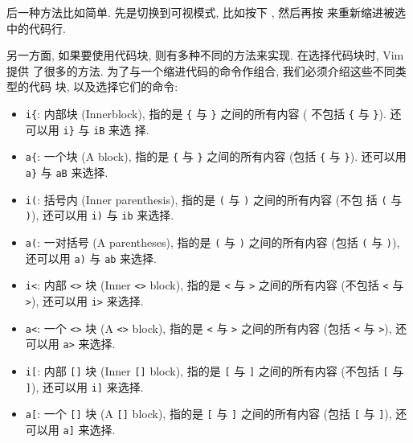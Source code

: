 后一种方法比如简单. 先是切换到可视模式, 比如按下 , 然后再按
\key{=} 来重新缩进被选中的代码行.

另一方面, 如果要使用代码块, 则有多种不同的方法来实现. 在选择代码块时, Vim 提供
了很多的方法. 为了与一个缩进代码的命令作组合, 我们必须介绍这些不同类型的代码
块, 以及选择它们的命令:

\begin{itemize}
    \item \verb'i{': 内部块 (Innerblock), 指的是 \verb'{' 与 \verb'}'
        之间的所有内容 (
        不包括 \verb'{' 与 \verb'}'). 还可以用 \verb'i}' 与 \texttt{iB} 来选
        择.
    \item \verb'a{': 一个块 (A block), 指的是 \verb'{' 与 \verb'}'
        之间的所有内容 (包括
        \verb'{' 与 \verb'}'). 还可以用 \verb'a}' 与 \verb'aB' 来选择.
    \item \verb'i(': 括号内 (Inner parenthesis), 指的是 \verb'(' 与 \verb')'
        之间的所有内容 (不包
        括 \verb'(' 与 \verb')'), 还可以用 \verb'i)' 与 \verb'ib' 来选择.
    \item \verb'a(': 一对括号 (A parentheses), 指的是 \verb'(' 与 \verb')'
        之间的所有内容 (包括 \verb'(' 与 \verb')'), 还可以用 \verb'a)' 与
        \verb'ab' 来选择.
    \item \verb'i<': 内部 \verb'<>' 块 (Inner \verb'<>' block), 指的是
        \verb'<' 与 \verb'>'
        之间的所有内容 (不包括 \verb'<' 与 \verb'>'), 还可以用 \verb'i>'
        来选择.
    \item \verb'a<': 一个 \verb'<>' 块 (A \verb'<>' block), 指的是
        \verb'<' 与 \verb'>'
        之间的所有内容 (包括 \verb'<' 与 \verb'>'), 还可以用 \verb'a>'
        来选择.
    \item \verb'i[': 内部 \verb'[]' 块 (Inner \verb'[]' block), 指的是
        \verb'[' 与 \verb']'
        之间的所有内容 (不包括 \verb'[' 与 \verb']'), 还可以用 \verb'i]'
        来选择.
    \item \verb'a[': 一个 \verb'[]' 块 (A \verb'[]' block), 指的是
        \verb'[' 与 \verb']'
        之间的所有内容 (包括 \verb'[' 与 \verb']'), 还可以用 \verb'a]'
        来选择.
\end{itemize}

